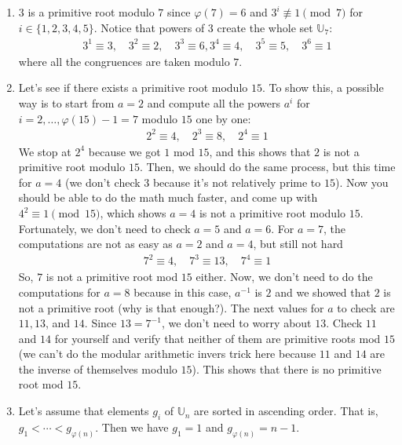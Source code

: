	\begin{example}
	$ $
	\begin{enumerate}
		\item $3$ is a primitive root modulo $7$ since $\varphi(7)=6$ and $3^i\not\equiv1\pmod 7$ for $i\in\{1,2,3,4,5\}$. Notice that powers of $3$ create the whole set $\mathbb U_7$:
		\begin{align*}
			3^1 \equiv 3, \quad 3^2 \equiv 2, \quad 3^3 \equiv 6, 3^4 \equiv 4, \quad 3^5 \equiv 5, \quad 3^6 \equiv 1
		\end{align*}
		where all the congruences are taken modulo $7$.
		\item Let's see if there exists a primitive root modulo $15$. To show this, a possible way is to start from $a=2$ and compute all the powers $a^i$ for $i=2,\ldots,\varphi(15)-1=7$ modulo $15$ one by one:
			\begin{align*}
				2^2 \equiv 4, \quad 2^3 \equiv 8, \quad 2^4 \equiv 1
			\end{align*}
		We stop at $2^4$ because we got $1$ mod $15$, and this shows that $2$ is not a primitive root modulo $15$. Then, we should do the same process, but this time for $a=4$ (we don't check $3$ because it's not relatively prime to $15$). Now you should be able to do the math much faster, and come up with $4^2 \equiv 1 \pmod{15}$, which shows $a=4$ is not a primitive root modulo $15$. Fortunately, we don't need to check $a=5$ and $a=6$. For $a=7$, the computations are not as easy as $a=2$ and $a=4$, but still not hard
			\begin{align*}
				7^2 \equiv 4, \quad 7^3 \equiv 13, \quad 7^4 \equiv 1
			\end{align*}
		So, $7$ is not a primitive root mod $15$ either. Now, we don't need to do the computations for $a=8$ because in this case, $a^{-1}$ is $2$ and we showed that $2$ is not a primitive root (why is that enough?). The next values for $a$ to check are $11, 13$, and $14$. Since $13=7^{-1}$, we don't need to worry about $13$. Check $11$ and $14$ for yourself and verify that neither of them are primitive roots mod $15$ (we can't do the modular arithmetic invers trick here because $11$ and $14$ are the inverse of themselves modulo $15$). This shows that there is no primitive root mod $15$.

		\item Let's assume that elements $g_i$ of $\mathbb U_n$ are sorted in ascending order. That is, $g_1<\cdots<g_{\varphi(n)}$. Then we  have $g_1=1$ and $g_{\varphi(n)}=n-1$.
	\end{enumerate}
\end{example}



